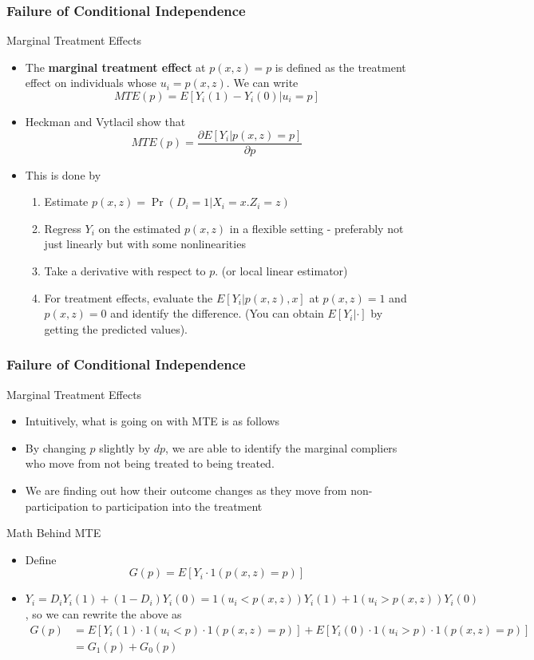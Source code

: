 \documentclass{beamer}
\begin{document}
\begin{frame}
\frametitle{Failure of Conditional Independence}
Marginal Treatment Effects
\begin{itemize}
\item The \textbf{marginal treatment effect} at $p(x,z)=p$ is defined as the treatment effect on individuals whose $u_i=p(x,z)$. We can write
\[
MTE(p)=E[Y_i(1)-Y_i(0)| u_i=p]
\]
\item Heckman and Vytlacil show that 
\[
MTE(p)=\frac{\partial E[Y_i | p(x,z)=p]}{\partial p}
\]
\item This is done by 
\begin{enumerate}
\item Estimate $p(x,z)=\Pr(D_i=1|X_i=x. Z_i=z)$
\item Regress $Y_i$ on the estimated $p(x,z)$ in a flexible setting - preferably not just linearly but with some nonlinearities
\item Take a derivative with respect to $p$. (or local linear estimator)
\item For treatment effects, evaluate the $E[Y_i|p(x,z),x]$ at $p(x,z)=1$ and $p(x,z)=0$ and identify the difference. (You can obtain $E[Y_i|\cdot]$ by getting the predicted values).  
\end{enumerate}
\end{itemize}
\end{frame}

\begin{frame}
\frametitle{Failure of Conditional Independence}
Marginal Treatment Effects
\begin{itemize}
\item Intuitively, what is going on with MTE is as follows
\item By changing $p$ slightly by $dp$, we are able to identify the marginal compliers who move from not being treated to being treated. 
\item We are finding out how their outcome changes as they move from non-participation to participation into the treatment
\end{itemize}
Math Behind MTE
\begin{itemize}
\item Define
\[
G(p)=E[Y_i\cdot 1(p(x,z)=p)]
\]
\item \footnotesize{$Y_i=D_iY_i(1)+(1-D_i)Y_i(0)=1(u_i<p(x,z))Y_i(1)+1(u_i>p(x,z))Y_i(0)$}\normalsize, so we can rewrite the above as
\footnotesize{\begin{align*}
G(p)&=E[Y_i(1)\cdot 1(u_i<p)\cdot 1(p(x,z)=p)]+E[Y_i(0)\cdot 1(u_i>p)\cdot 1(p(x,z)=p)]\\
&=G_1(p)+G_0(p)
\end{align*}}\normalsize
\end{itemize}
\end{frame}
\end{document}
